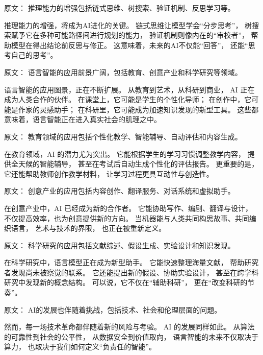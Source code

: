 原文：
推理能力的增强包括链式思维、树搜索、验证机制、反思学习等。  

推理能力的增强，将成为AI进化的关键。  
链式思维让模型学会“分步思考”，  
树搜索赋予它在多种可能路径间进行规划的能力，  
验证机制则像内在的“审校者”，  
帮助模型在得出结论前反思与修正。  
这意味着，未来的AI不仅能“回答”，  
还能“思考自己的思考”。  



原文：
语言智能的应用前景广阔，包括教育、创意产业和科学研究等领域。  

语言智能的应用图景，正在不断扩展。  
从教育到艺术，从科研到商业，  
AI 正在成为人类合作的伙伴。  
在课堂上，它可能是学生的个性化导师；  
在创作中，它可能是作家的灵感助手；  
在科研里，它可能成为加速知识发现的新型工具。  
这些都意味着，语言智能正在进入真实社会的肌理之中。  



原文：
教育领域的应用包括个性化教学、智能辅导、自动评估和内容生成。  

在教育领域，AI 的潜力尤为突出。  
它能根据学生的学习习惯调整教学内容，  
提供全天候的智能辅导，  
甚至在考试后自动生成个性化的评估报告。  
更重要的是，它还能帮助教师创作教学材料，  
让学习过程更具互动性与创造性。  



原文：
创意产业的应用包括内容创作、翻译服务、对话系统和虚拟助手。  

在创意产业中，AI 已经成为新的合作者。  
它能协助写作、编剧、翻译与设计，  
不仅提高效率，也为创意提供新的方向。  
当机器能与人类共同构思故事、共同编织语言，  
艺术与技术的界限，  
也正在被重新定义。  



原文：
科学研究的应用包括文献综述、假设生成、实验设计和知识发现。  

在科学研究中，语言模型正在成为新型助手。  
它能快速整理海量文献，  
帮助研究者发现尚未被察觉的联系。  
它还能提出新的假设、协助实验设计，  
甚至在跨学科研究中发现新的概念结构。  
可以说，它不仅在“辅助科研”，  
更在“改变科研的节奏”。  



原文：
AI的发展也伴随着挑战，包括技术、社会和伦理层面的问题。  

然而，每一场技术革命都伴随着新的风险与考验。  
AI 的发展同样如此。  
从算法的可靠性到社会的公平性，  
从数据安全到价值取向，  
语言智能的未来不仅取决于算力，  
也取决于我们如何定义“负责任的智能”。  



